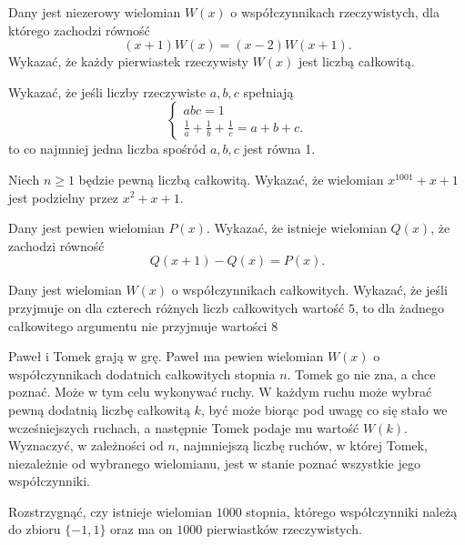 \begin{problem}{1}
	Dany jest niezerowy wielomian $W(x)$ o współczynnikach rzeczywistych, dla którego zachodzi równość
	\[
		(x + 1)W(x) = (x - 2)W(x + 1).
	\]
	Wykazać, że każdy pierwiastek rzeczywisty $W(x)$ jest liczbą całkowitą.
\end{problem}


\begin{problem}{2}
	Wykazać, że jeśli liczby rzeczywiste $a, b, c$ spełniają
    \[
    \begin{cases}
        abc = 1 \\
        \frac{1}{a} + \frac{1}{b} + \frac{1}{c} = a + b + c.
    \end{cases}
    \]
    to co najmniej jedna liczba spośród $a, b, c$ jest równa 1.
\end{problem}

\begin{problem}{3}
	Niech $n \geqslant 1$ będzie pewną liczbą całkowitą. Wykazać, że wielomian $x^{1001} + x + 1$ jest podzielny przez $x^2 + x + 1$.
\end{problem}


\begin{problem}{4}
	Dany jest pewien wielomian $P(x)$. Wykazać, że istnieje wielomian $Q(x)$, że zachodzi równość
	\[
		Q(x + 1) - Q(x) = P(x).
	\]
\end{problem}

\begin{problem}{5}
	Dany jest wielomian $W(x)$ o współczynnikach całkowitych. Wykazać, że jeśli przyjmuje on dla czterech różnych liczb całkowitych wartość $5$, to dla żadnego całkowitego argumentu nie przyjmuje wartości $8$
\end{problem}

\begin{problem}{6}
	Paweł i Tomek grają w grę.
	Paweł ma pewien wielomian $W(x)$ o współczynnikach dodatnich całkowitych stopnia $n$. Tomek go nie zna, a chce poznać. Może w tym celu wykonywać ruchy. W każdym ruchu może wybrać pewną dodatnią liczbę całkowitą $k$, być może biorąc pod uwagę co się stało we wcześniejszych ruchach, a następnie Tomek podaje mu wartość $W(k)$. Wyznaczyć, w zależności od $n$, najmniejszą liczbę ruchów, w której Tomek, niezależnie od wybranego wielomianu, jest w stanie poznać wszystkie jego współczynniki.
\end{problem}

\begin{problem}{7}
	Rozstrzygnąć, czy istnieje wielomian $1000$ stopnia, którego współczynniki należą do zbioru $\{-1, 1\}$ oraz ma on $1000$ pierwiastków rzeczywistych.
\end{problem}

